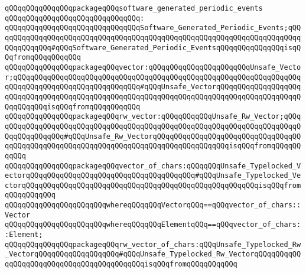 \newline
\verb|qQQqqQQqqQQqqQQqpackageqQQqsoftware_generated_periodic_events|\newline
\verb|qQQqqQQqqQQqqQQqqQQqqQQqqQQqqQQq:|\newline
\verb|qQQqqQQqqQQqqQQqqQQqqQQqqQQqqQQqSoftware_Generated_Periodic_Events;qQQqqQQqqQQqqQQqqQQqqQQqqQQqqQQqqQQqqQQqqQQqqQQqqQQqqQQqqQQqqQQqqQQqqQQqqQQqqQQqqQQq#qQQqSoftware_Generated_Periodic_EventsqQQqqQQqqQQqqQQqisqQQqfromqQQqqQQqqQQq|\newline
\newline
\verb|qQQqqQQqqQQqqQQqpackageqQQqvector:qQQqqQQqqQQqqQQqqQQqqQQqUnsafe_Vector;qQQqqQQqqQQqqQQqqQQqqQQqqQQqqQQqqQQqqQQqqQQqqQQqqQQqqQQqqQQqqQQqqQQqqQQqqQQqqQQqqQQqqQQqqQQqqQQqqQQq#qQQqUnsafe_VectorqQQqqQQqqQQqqQQqqQQqqQQqqQQqqQQqqQQqqQQqqQQqqQQqqQQqqQQqqQQqqQQqqQQqqQQqqQQqqQQqqQQqqQQqqQQqqQQqqQQqisqQQqfromqQQqqQQqqQQq|\newline
\verb|qQQqqQQqqQQqqQQqpackageqQQqrw_vector:qQQqqQQqqQQqUnsafe_Rw_Vector;qQQqqQQqqQQqqQQqqQQqqQQqqQQqqQQqqQQqqQQqqQQqqQQqqQQqqQQqqQQqqQQqqQQqqQQqqQQqqQQqqQQqqQQq#qQQqUnsafe_Rw_VectorqQQqqQQqqQQqqQQqqQQqqQQqqQQqqQQqqQQqqQQqqQQqqQQqqQQqqQQqqQQqqQQqqQQqqQQqqQQqqQQqqQQqqQQqisqQQqfromqQQqqQQqqQQq|\newline
\newline
\verb|qQQqqQQqqQQqqQQqpackageqQQqvector_of_chars:qQQqqQQqUnsafe_Typelocked_VectorqQQqqQQqqQQqqQQqqQQqqQQqqQQqqQQqqQQqqQQq#qQQqUnsafe_Typelocked_VectorqQQqqQQqqQQqqQQqqQQqqQQqqQQqqQQqqQQqqQQqqQQqqQQqqQQqqQQqisqQQqfromqQQqqQQqqQQq|\newline
\verb|qQQqqQQqqQQqqQQqqQQqqQQqwhereqQQqqQQqVectorqQQq==qQQqvector_of_chars::Vector|\newline
\verb|qQQqqQQqqQQqqQQqqQQqqQQqwhereqQQqqQQqElementqQQq==qQQqvector_of_chars::Element;|\newline
\newline
\verb|qQQqqQQqqQQqqQQqpackageqQQqrw_vector_of_chars:qQQqUnsafe_Typelocked_Rw_VectorqQQqqQQqqQQqqQQqqQQq#qQQqUnsafe_Typelocked_Rw_VectorqQQqqQQqqQQqqQQqqQQqqQQqqQQqqQQqqQQqqQQqqQQqisqQQqfromqQQqqQQqqQQq|\newline
